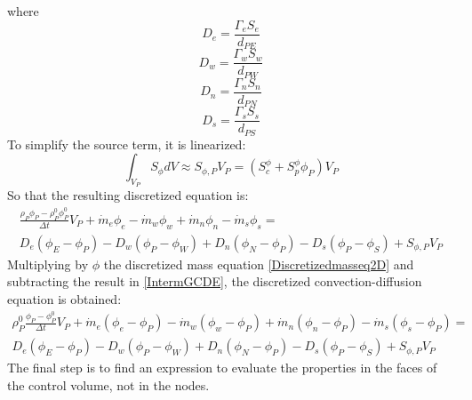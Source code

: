 where
\begin{equation}
D_{e}=\frac{\Gamma_{e}S_{e}}{d_{PE}}
\end{equation}
\begin{equation}
D_{w}=\frac{\Gamma_{w}S_{w}}{d_{PW}}
\end{equation}
\begin{equation}
D_{n}=\frac{\Gamma_{n}S_{n}}{d_{PN}}
\end{equation}
\begin{equation}
D_{s}=\frac{\Gamma_{s}S_{s}}{d_{PS}}
\end{equation}
To simplify the source term, it is linearized:
\begin{equation}
\int_{V_{P}}S_{\phi}dV\approx S_{\phi,P}V_{P}=\left(S_{c}^{\phi}+S_{p}^{\phi}\phi_{P}\right)V_{P}
\end{equation}
So that the resulting discretized equation is:
\begin{multline}
\frac{\rho_{P}\phi_{P}-\rho_{P}^{0}\phi_{P}^{0}}{\Delta t}V_{P}+\dot{m}_{e}\phi_{e}-\dot{m}_{w}\phi_{w}+\dot{m}_{n}\phi_{n}-\dot{m}_{s}\phi_{s}= \\
D_{e}\left(\phi_{E}-\phi_{P}\right)-D_{w}\left(\phi_{P}-\phi_{W}\right)+D_{n}\left(\phi_{N}-\phi_{P}\right)-D_{s}\left(\phi_{P}-\phi_{S}\right)+S_{\phi,P}V_{P}
\label{IntermGCDE}
\end{multline}
Multiplying by $\phi$ the discretized mass equation \ref{Discretizedmasseq2D} and subtracting the result in \ref{IntermGCDE}, the discretized convection-diffusion equation is obtained:
\begin{multline}
\rho_{P}^{0}\frac{\phi_{P}-\phi_{P}^{0}}{\Delta t}V_{P}+\dot{m}_{e}\left(\phi_{e}-\phi_{P}\right)-\dot{m}_{w}\left(\phi_{w}-\phi_{P}\right)+\dot{m}_{n}\left(\phi_{n}-\phi_{P}\right)-\dot{m}_{s}\left(\phi_{s}-\phi_{P}\right)= \\
D_{e}\left(\phi_{E}-\phi_{P}\right)-D_{w}\left(\phi_{P}-\phi_{W}\right)+D_{n}\left(\phi_{N}-\phi_{P}\right)-D_{s}\left(\phi_{P}-\phi_{S}\right)+S_{\phi,P}V_{P}
\label{DiscretizedGCDE}
\end{multline}
The final step is to find an expression to evaluate the properties in the faces of the control volume, not in the nodes.

